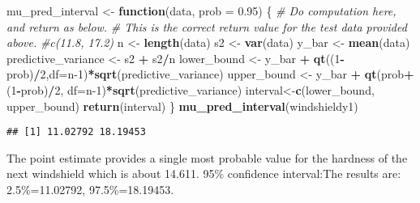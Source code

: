 \documentclass[
]{article}
\newenvironment{Shaded}{\begin{snugshade}}{\end{snugshade}}
\newcommand{\AttributeTok}[1]{\textcolor[rgb]{0.13,0.29,0.53}{#1}}
\newcommand{\CommentTok}[1]{\textcolor[rgb]{0.56,0.35,0.01}{\textit{#1}}}
\newcommand{\ControlFlowTok}[1]{\textcolor[rgb]{0.13,0.29,0.53}{\textbf{#1}}}
\newcommand{\DecValTok}[1]{\textcolor[rgb]{0.00,0.00,0.81}{#1}}
\newcommand{\FloatTok}[1]{\textcolor[rgb]{0.00,0.00,0.81}{#1}}
\newcommand{\FunctionTok}[1]{\textcolor[rgb]{0.13,0.29,0.53}{\textbf{#1}}}
\newcommand{\NormalTok}[1]{#1}
\newcommand{\OtherTok}[1]{\textcolor[rgb]{0.56,0.35,0.01}{#1}}
\newcommand{\SpecialCharTok}[1]{\textcolor[rgb]{0.81,0.36,0.00}{\textbf{#1}}}
\begin{document}
\begin{Shaded}
\begin{Highlighting}[]
\NormalTok{mu\_pred\_interval }\OtherTok{\textless{}{-}} \ControlFlowTok{function}\NormalTok{(data, }\AttributeTok{prob =} \FloatTok{0.95}\NormalTok{) \{}
    \CommentTok{\# Do computation here, and return as below.}
    \CommentTok{\# This is the correct return value for the test data provided above.}
    \CommentTok{\#c(11.8, 17.2)}
\NormalTok{    n }\OtherTok{\textless{}{-}} \FunctionTok{length}\NormalTok{(data)}
\NormalTok{    s2 }\OtherTok{\textless{}{-}} \FunctionTok{var}\NormalTok{(data)}
\NormalTok{    y\_bar }\OtherTok{\textless{}{-}} \FunctionTok{mean}\NormalTok{(data)}
\NormalTok{    predictive\_variance }\OtherTok{\textless{}{-}}\NormalTok{ s2 }\SpecialCharTok{+}\NormalTok{ s2}\SpecialCharTok{/}\NormalTok{n}
\NormalTok{    lower\_bound }\OtherTok{\textless{}{-}}\NormalTok{ y\_bar }\SpecialCharTok{+} \FunctionTok{qt}\NormalTok{((}\DecValTok{1}\SpecialCharTok{{-}}\NormalTok{prob)}\SpecialCharTok{/}\DecValTok{2}\NormalTok{,}\AttributeTok{df=}\NormalTok{n}\DecValTok{{-}1}\NormalTok{)}\SpecialCharTok{*}\FunctionTok{sqrt}\NormalTok{(predictive\_variance)}
\NormalTok{    upper\_bound }\OtherTok{\textless{}{-}}\NormalTok{ y\_bar }\SpecialCharTok{+} \FunctionTok{qt}\NormalTok{(prob}\SpecialCharTok{+}\NormalTok{(}\DecValTok{1}\SpecialCharTok{{-}}\NormalTok{prob)}\SpecialCharTok{/}\DecValTok{2}\NormalTok{, }\AttributeTok{df=}\NormalTok{n}\DecValTok{{-}1}\NormalTok{)}\SpecialCharTok{*}\FunctionTok{sqrt}\NormalTok{(predictive\_variance)}
\NormalTok{    interval}\OtherTok{\textless{}{-}}\FunctionTok{c}\NormalTok{(lower\_bound, upper\_bound)}
    \FunctionTok{return}\NormalTok{(interval)}
\NormalTok{\}}
\FunctionTok{mu\_pred\_interval}\NormalTok{(windshieldy1)}
\end{Highlighting}
\end{Shaded}

\begin{verbatim}
## [1] 11.02792 18.19453
\end{verbatim}

The point estimate provides a single most probable value for the
hardness of the next windshield which is about 14.611. 95\% confidence
interval:The results are: 2.5\%=11.02792, 97.5\%=18.19453.
\end{document}
